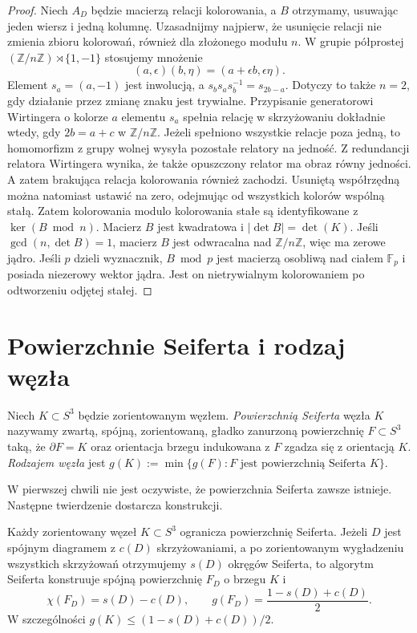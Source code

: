 \begin{proof}
Niech $A_D$ będzie macierzą relacji kolorowania, a
$B$ otrzymamy, usuwając jeden wiersz i jedną kolumnę.
Uzasadnijmy najpierw, że usunięcie relacji nie zmienia
zbioru kolorowań, również dla złożonego modułu $n$.
W grupie półprostej
$(\mathbb Z/n\mathbb Z)\rtimes\{1,-1\}$ stosujemy mnożenie
\[
(a,\epsilon)(b,\eta)=(a+\epsilon b,\epsilon\eta).
\]
Element $s_a=(a,-1)$ jest inwolucją, a
$s_b s_a s_b^{-1}=s_{2b-a}$. Dotyczy to także $n=2$,
gdy działanie przez zmianę znaku jest trywialne.
Przypisanie generatorowi Wirtingera o kolorze $a$
elementu $s_a$ spełnia relację w skrzyżowaniu dokładnie
wtedy, gdy $2b=a+c$ w $\mathbb Z/n\mathbb Z$.
Jeżeli spełniono wszystkie relacje poza jedną, to
homomorfizm z grupy wolnej wysyła pozostałe relatory
na jedność. Z redundancji relatora Wirtingera wynika,
że także opuszczony relator ma obraz równy jedności.
A zatem brakująca relacja kolorowania również zachodzi.
Usuniętą współrzędną można natomiast ustawić na zero,
odejmując od wszystkich kolorów wspólną stałą. Zatem kolorowania
modulo kolorowania stałe są identyfikowane z
$\ker(B\bmod n)$. Macierz $B$ jest kwadratowa i
$|\det B|=\det(K)$. Jeśli $\gcd(n,\det B)=1$,
macierz $B$ jest odwracalna nad $\mathbb Z/n\mathbb Z$,
więc ma zerowe jądro. Jeśli $p$ dzieli wyznacznik,
$B\bmod p$ jest macierzą osobliwą nad ciałem
$\mathbb F_p$ i posiada niezerowy wektor jądra.
Jest on nietrywialnym kolorowaniem po odtworzeniu
odjętej stałej.
\end{proof}

\section{Powierzchnie Seiferta i rodzaj węzła}
\label{sec:kt-seifert}

\begin{definicja}
Niech $K\subset S^3$ będzie zorientowanym węzłem.
\emph{Powierzchnią Seiferta} węzła $K$ nazywamy zwartą,
spójną, zorientowaną, gładko zanurzoną powierzchnię
$F\subset S^3$ taką, że $\partial F=K$ oraz orientacja
brzegu indukowana z $F$ zgadza się z orientacją $K$.
\emph{Rodzajem węzła} jest $g(K):=\min\{g(F):F\text{ jest
powierzchnią Seiferta }K\}$.
\end{definicja}

W pierwszej chwili nie jest oczywiste, że powierzchnia Seiferta
zawsze istnieje. Następne twierdzenie dostarcza konstrukcji.

\begin{twierdzenie}
Każdy zorientowany węzeł $K\subset S^3$ ogranicza powierzchnię
Seiferta. Jeżeli $D$ jest spójnym diagramem z $c(D)$ skrzyżowaniami,
a po zorientowanym wygładzeniu wszystkich skrzyżowań otrzymujemy
$s(D)$ okręgów Seiferta, to algorytm Seiferta konstruuje spójną
powierzchnię $F_D$ o brzegu $K$ i
\[
\chi(F_D)=s(D)-c(D),\qquad
 g(F_D)=\frac{1-s(D)+c(D)}{2}.
\]
W szczególności $g(K)\leq(1-s(D)+c(D))/2$.
\end{twierdzenie}

